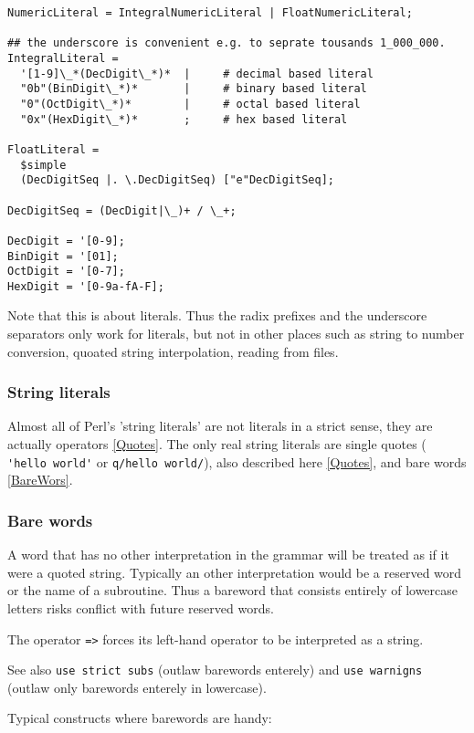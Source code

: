 \documentclass{article}
\begin{document}
\begin{verbatim}
NumericLiteral = IntegralNumericLiteral | FloatNumericLiteral;
        
## the underscore is convenient e.g. to seprate tousands 1_000_000.
IntegralLiteral =
  '[1-9]\_*(DecDigit\_*)*  |     # decimal based literal
  "0b"(BinDigit\_*)*       |     # binary based literal
  "0"(OctDigit\_*)*        |     # octal based literal
  "0x"(HexDigit\_*)*       ;     # hex based literal

FloatLiteral =
  $simple
  (DecDigitSeq |. \.DecDigitSeq) ["e"DecDigitSeq];
  
DecDigitSeq = (DecDigit|\_)+ / \_+;

DecDigit = '[0-9];
BinDigit = '[01];
OctDigit = '[0-7];
HexDigit = '[0-9a-fA-F];
\end{verbatim}

Note that this is about literals. Thus the radix prefixes and the underscore
separators only work for literals, but not in other places such as string to
number conversion, quoated string interpolation, reading from files.


\subsubsection{String literals}

Almost all of Perl's 'string literals' are not literals in a strict sense, they
are actually operators \ref{Quotes}. The only real string literals are single
quotes ( \verb|'hello world'| or \verb|q/hello world/|), also described here
\ref{Quotes}, and bare words \ref{BareWors}.

\label{BareWords}
\subsubsection{Bare words}

A word that has no other interpretation in the grammar will be treated as if it
were a quoted string. Typically an other interpretation would be a reserved word
or the name of a subroutine. Thus a bareword that consists entirely of lowercase
letters risks conflict with future reserved words.

The operator \verb|=>| forces its left-hand operator to be interpreted as a
string. 

See also \verb|use strict subs| (outlaw barewords enterely) and
\verb|use warnigns| (outlaw only barewords enterely in lowercase).

Typical constructs where barewords are handy:
\end{document}
